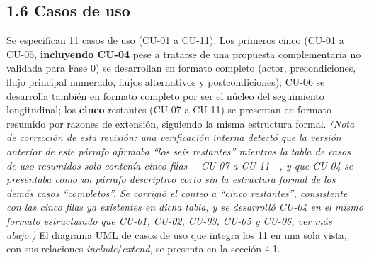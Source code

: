 \documentclass[11pt,a4paper]{article}
\begin{document}
\subsection{1.6 Casos de uso}\label{casos-de-uso}

Se especifican 11 casos de uso (CU-01 a CU-11). Los primeros cinco (CU-01 a CU-05, \textbf{incluyendo CU-04} pese a tratarse de una propuesta complementaria no validada para Fase 0) se desarrollan en formato completo (actor, precondiciones, flujo principal numerado, flujos alternativos y postcondiciones); CU-06 se desarrolla también en formato completo por ser el núcleo del seguimiento longitudinal; los \textbf{cinco} restantes (CU-07 a CU-11) se presentan en formato resumido por razones de extensión, siguiendo la misma estructura formal. \emph{(Nota de corrección de esta revisión: una verificación interna detectó que la versión anterior de este párrafo afirmaba ``los seis restantes'' mientras la tabla de casos de uso resumidos solo contenía cinco filas ---CU-07 a CU-11---, y que CU-04 se presentaba como un párrafo descriptivo corto sin la estructura formal de los demás casos ``completos''. Se corrigió el conteo a ``cinco restantes'', consistente con las cinco filas ya existentes en dicha tabla, y se desarrolló CU-04 en el mismo formato estructurado que CU-01, CU-02, CU-03, CU-05 y CU-06, ver más abajo.)} El diagrama UML de casos de uso que integra los 11 en una sola vista, con sus relaciones \emph{include}/\emph{extend}, se presenta en la sección 4.1.
\end{document}
